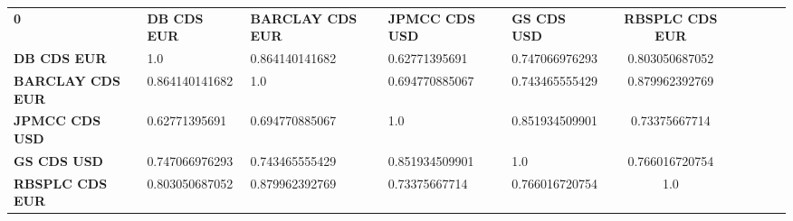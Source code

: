 \begin{center}
 \begin{tabular}{|l|l|l|l|l|c|c|c|c|c|}
\hline
\textbf{0} & \textbf{DB CDS EUR} & \textbf{BARCLAY CDS EUR} & \textbf{JPMCC CDS USD} & \textbf{GS CDS USD} & \textbf{RBSPLC CDS EUR}\\\hhline{|=|=|=|=|=|=|}
\textbf{DB CDS EUR} & 1.0 & 0.864140141682 & 0.62771395691 & 0.747066976293 & 0.803050687052\\
\textbf{BARCLAY CDS EUR} & 0.864140141682 & 1.0 & 0.694770885067 & 0.743465555429 & 0.879962392769\\
\textbf{JPMCC CDS USD} & 0.62771395691 & 0.694770885067 & 1.0 & 0.851934509901 & 0.73375667714\\
\textbf{GS CDS USD} & 0.747066976293 & 0.743465555429 & 0.851934509901 & 1.0 & 0.766016720754\\
\textbf{RBSPLC CDS EUR} & 0.803050687052 & 0.879962392769 & 0.73375667714 & 0.766016720754 & 1.0\\
\hline
\end{tabular}
\end{center}